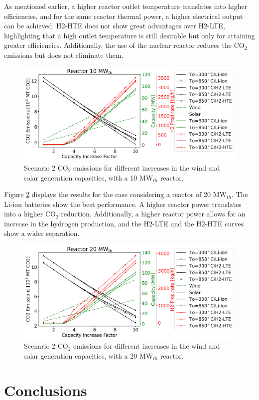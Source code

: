 \documentclass{anstrans}
\begin{document}
As mentioned earlier, a higher reactor outlet temperature translates into higher efficiencies, and for the same reactor thermal power, a higher electrical output can be achieved.
H2-HTE does not show great advantages over H2-LTE, highlighting that a high outlet temperature is still desirable but only for attaining greater efficiencies.
Additionally, the use of the nuclear reactor reduces the CO$_2$ emissions but does not eliminate them.

\begin{figure}[htbp!] %
    \centering
    \includegraphics[width=0.99\linewidth]{figures/scenario2-10-summer-emissions}
    \hfill
    \caption{Scenario 2 CO$_2$ emissions for different increases in the wind and solar generation capacities, with a 10 MW$_{th}$ reactor.}
    \label{fig:2-summer-10-emissions}
\end{figure}

Figure \ref{fig:2-summer-20-emissions} displays the results for the case considering a reactor of 20 MW$_{th}$.
The Li-ion batteries show the best performance.
A higher reactor power translates into a higher CO$_2$ reduction.
Additionally, a higher reactor power allows for an increase in the hydrogen production, and the H2-LTE and the H2-HTE curves show a wider separation.

\begin{figure}[htbp!] %
    \centering
    \includegraphics[width=0.99\linewidth]{figures/scenario2-20-summer-emissions}
    \hfill
    \caption{Scenario 2 CO$_2$ emissions for different increases in the wind and solar generation capacities, with a 20 MW$_{th}$ reactor.}
    \label{fig:2-summer-20-emissions}
\end{figure}


\section{Conclusions}





\end{document}
